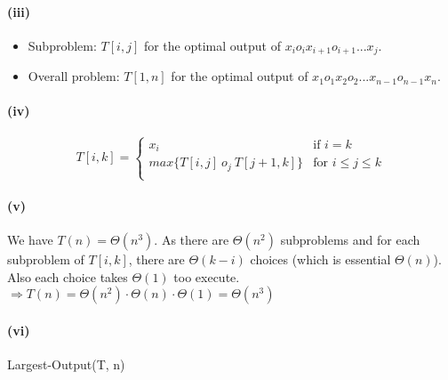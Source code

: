 \documentclass[11pt]{article}
\begin{document}
\paragraph{(iii)}

\begin{itemize}
    \item Subproblem: $T[i, j]$ for the optimal output of $x_i o_i x_{i+1} o_{i+1} ... x_{j}$.
    \item Overall problem: $T[1, n]$ for the optimal output of $x_1 o_1 x_2 o_2 ... x_{n-1} o_{n-1} x_n$.
\end{itemize}

\paragraph{(iv)}

\begin{equation}
    T[i,k] =
    \begin{cases}
        x_i & \text{if \ } i = k \\
        max\{T[i,j] \ o_j \ T[j+1, k]\} &\text{for \ } i \leq j \leq k \\
    \end{cases}\nonumber
\end{equation}

\paragraph{(v)}

We have $T(n) = \Theta(n^3)$. As there are $\Theta(n^2)$ subproblems and for each subproblem of $T[i,k]$, there are $\Theta(k-i)$ choices (which is essential $\Theta(n)$). Also each choice takes $\Theta(1)$ too execute. \\
$\Longrightarrow T(n) =  \Theta(n^2) \cdot  \Theta(n) \cdot \Theta(1) =  \Theta(n^3)$


\paragraph{(vi)}

\begin{algorithm}[H]
\caption{Largest-Output(T, n)}
    \begin{algorithmic}[1]
        \EndFor
    \end{algorithmic}
\end{algorithm}
\end{document}
